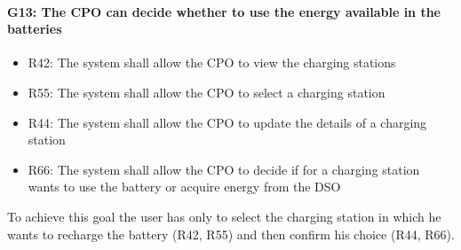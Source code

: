 \paragraph{G13: The CPO can decide whether to use the energy available in the batteries}
\begin{itemize}
    \item R42: The system shall allow the CPO to view the charging stations
    \item R55: The system shall allow the CPO to select a charging station
    \item R44: The system shall allow the CPO to update the details of a charging station
    \item R66: The system shall allow the CPO to decide if for a charging station wants to use the battery or acquire energy from the DSO
\end{itemize}
To achieve this goal the user has only to select the charging station in which he wants to recharge the battery (R42, R55) and then confirm his choice (R44, R66).

